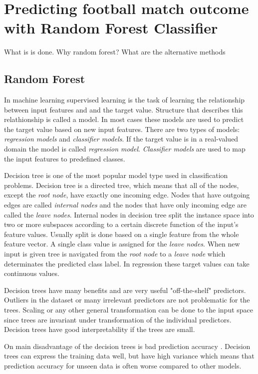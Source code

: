 \section{Predicting football match outcome with Random Forest Classifier}
What is is done. Why random forest? What are the alternative methods
\subsection{Random Forest}
\label{ss:randomforest}
In machine learning supervised learning is the task of learning the relationship between input features and and the target value. Structure that describes this relathionship is called a model. In most cases these models are used to predict the target value based on new input features. There are two types of models: \textit{regression models} and \textit{classifier models}. If the target value is in a real-valued domain the model is called \textit{regression model}. \textit{Classifier models} are used to map the input features to predefined classes. \cite{rokach2005top}

Decision tree is one of the most popular model type used in classification problems. Decision tree is a directed tree, which means that all of the nodes, except the \textit{root node}, have exactly one incoming edge. Nodes that have outgoing edges are called \textit{internal nodes} and the nodes that have only incoming edge are called the \textit{leave nodes}. Internal nodes in decision tree split the instance space into two or more subspaces according to a certain discrete function of the input's feature values. Usually split is done based on a single feature from the whole feature vector. A single class value is assigned for the \textit{leave nodes}. When new input is given tree is navigated from the \textit{root node} to a \textit{leave node} which determinates the predicted class label. In regression these target values can take continuous values. \cite{rokach2005top}

Decision trees have many benefits and are very useful "off-the-shelf" predictors. Outliers in the dataset or many irrelevant predictors are not problematic for the trees. Scaling or any other general transformation can be done to the input space since trees are invariant under transformation of the individual predictors. \cite{friedman2001elements} Decision trees have good interpretability if the trees are small.

On main disadvantage of the decision trees is bad prediction accuracy \cite{friedman2001elements}. Decision trees can express the training data well, but have high variance which means that prediction accuracy for unseen data is often worse compared to other models.

